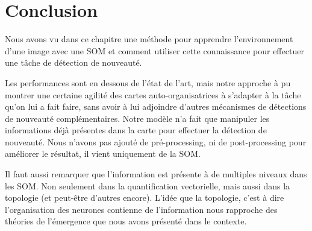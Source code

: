 \chapter*{Conclusion}

Nous avons vu dans ce chapitre une méthode pour apprendre l'environnement d'une image avec une SOM et comment utiliser cette connaissance pour effectuer une tâche de détection de nouveauté.

Les performances sont en dessous de l'état de l'art, mais notre approche à pu montrer une certaine agilité des cartes auto-organisatrices à s'adapter à la tâche qu'on lui a fait faire, sans avoir à lui adjoindre d'autres mécanismes de détections de nouveauté complémentaires. Notre modèle n'a fait que manipuler les informations déjà présentes dans la carte pour effectuer la détection de nouveauté. Nous n'avons pas ajouté de pré-processing, ni de post-processing pour améliorer le résultat, il vient uniquement de la SOM.

Il faut aussi remarquer que l'information est présente à de multiples niveaux dans les SOM. Non seulement dans la quantification vectorielle, mais aussi dans la topologie (et peut-être d'autres encore). L'idée que la topologie, c'est à dire l'organisation des neurones contienne de l'information nous rapproche des théories de l'émergence que nous avons présenté dans le contexte.
